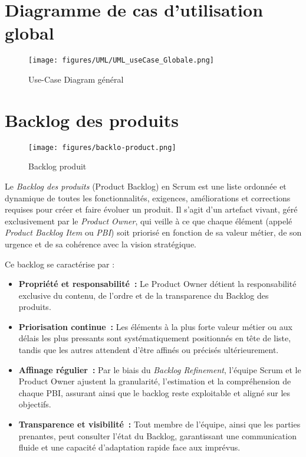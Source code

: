 \documentclass[12pt,a4paper]{report}
\begin{document}
\section{Diagramme de cas d’utilisation global}

\begin{figure}[H]
  \centering
  \texttt{[image: figures/UML/UML\_useCase\_Globale.png]}
  \caption{Use-Case Diagram général}
  \label{fig:use_case_global}
\end{figure}

\section{Backlog des produits}

\begin{figure}[H]
  \centering
  \texttt{[image: figures/backlo-product.png]}
  \caption{Backlog produit}
  \label{fig:backlog_product}
\end{figure}

\vspace{1em}

Le \emph{Backlog des produits} (Product Backlog) en Scrum est une liste ordonnée et dynamique de toutes les fonctionnalités, exigences, améliorations et corrections requises pour créer et faire évoluer un produit. Il s’agit d’un artefact vivant, géré exclusivement par le \emph{Product Owner}, qui veille à ce que chaque élément (appelé \emph{Product Backlog Item} ou \emph{PBI}) soit priorisé en fonction de sa valeur métier, de son urgence et de sa cohérence avec la vision stratégique.  

Ce backlog se caractérise par :
\begin{itemize}
  \item \textbf{Propriété et responsabilité :} Le Product Owner détient la responsabilité exclusive du contenu, de l’ordre et de la transparence du Backlog des produits.
  \item \textbf{Priorisation continue :} Les éléments à la plus forte valeur métier ou aux délais les plus pressants sont systématiquement positionnés en tête de liste, tandis que les autres attendent d’être affinés ou précisés ultérieurement.
  \item \textbf{Affinage régulier :} Par le biais du \emph{Backlog Refinement}, l’équipe Scrum et le Product Owner ajustent la granularité, l’estimation et la compréhension de chaque PBI, assurant ainsi que le backlog reste exploitable et aligné sur les objectifs.
  \item \textbf{Transparence et visibilité :} Tout membre de l’équipe, ainsi que les parties prenantes, peut consulter l’état du Backlog, garantissant une communication fluide et une capacité d’adaptation rapide face aux imprévus.
\end{itemize}
\end{document}
